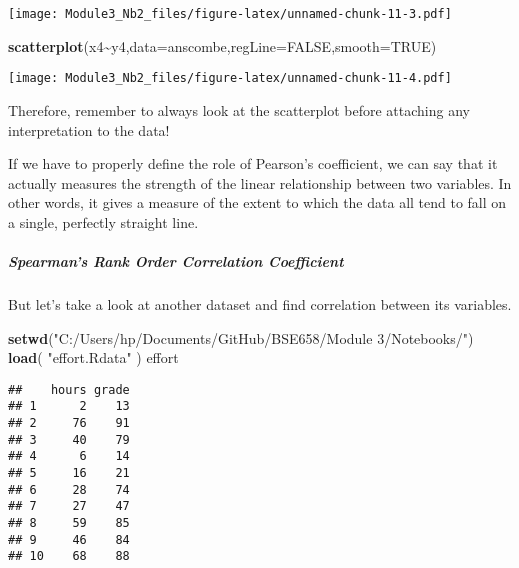 \documentclass[
]{article}
\newenvironment{Shaded}{\begin{snugshade}}{\end{snugshade}}
\newcommand{\AttributeTok}[1]{\textcolor[rgb]{0.13,0.29,0.53}{#1}}
\newcommand{\ConstantTok}[1]{\textcolor[rgb]{0.56,0.35,0.01}{#1}}
\newcommand{\FunctionTok}[1]{\textcolor[rgb]{0.13,0.29,0.53}{\textbf{#1}}}
\newcommand{\NormalTok}[1]{#1}
\newcommand{\SpecialCharTok}[1]{\textcolor[rgb]{0.81,0.36,0.00}{\textbf{#1}}}
\newcommand{\StringTok}[1]{\textcolor[rgb]{0.31,0.60,0.02}{#1}}
\begin{document}
\texttt{[image: Module3\_Nb2\_files/figure-latex/unnamed-chunk-11-3.pdf]}

\begin{Shaded}
\begin{Highlighting}[]
\FunctionTok{scatterplot}\NormalTok{(x4}\SpecialCharTok{\textasciitilde{}}\NormalTok{y4,}\AttributeTok{data=}\NormalTok{anscombe,}\AttributeTok{regLine=}\ConstantTok{FALSE}\NormalTok{,}\AttributeTok{smooth=}\ConstantTok{TRUE}\NormalTok{)}
\end{Highlighting}
\end{Shaded}

\texttt{[image: Module3\_Nb2\_files/figure-latex/unnamed-chunk-11-4.pdf]}

Therefore, remember to always look at the scatterplot before attaching
any interpretation to the data!

If we have to properly define the role of Pearson's coefficient, we can
say that it actually measures the strength of the linear relationship
between two variables. In other words, it gives a measure of the extent
to which the data all tend to fall on a single, perfectly straight line.

\subparagraph{Spearman's Rank Order Correlation
Coefficient}\label{spearmans-rank-order-correlation-coefficient}

But let's take a look at another dataset and find correlation between
its variables.

\begin{Shaded}
\begin{Highlighting}[]
\FunctionTok{setwd}\NormalTok{(}\StringTok{"C:/Users/hp/Documents/GitHub/BSE658/Module 3/Notebooks/"}\NormalTok{)}
\FunctionTok{load}\NormalTok{( }\StringTok{"effort.Rdata"}\NormalTok{ )}
\NormalTok{effort}
\end{Highlighting}
\end{Shaded}

\begin{verbatim}
##    hours grade
## 1      2    13
## 2     76    91
## 3     40    79
## 4      6    14
## 5     16    21
## 6     28    74
## 7     27    47
## 8     59    85
## 9     46    84
## 10    68    88
\end{verbatim}

\begin{Shaded}
\end{Shaded}
\end{document}
